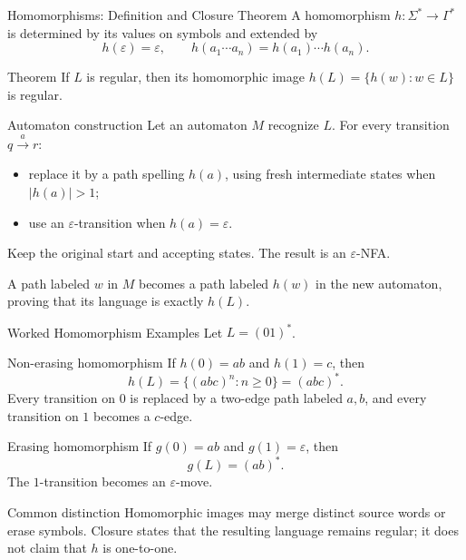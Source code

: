 \documentclass[10pt]{beamer}
\begin{document}
\begin{frame}{Homomorphisms: Definition and Closure Theorem}
  \small
  A homomorphism $h:\Sigma^*\to\Gamma^*$ is determined by its values on
  symbols and extended by
  \[
    h(\varepsilon)=\varepsilon,
    \qquad
    h(a_1\cdots a_n)=h(a_1)\cdots h(a_n).
  \]
  \begin{block}{Theorem}
    If $L$ is regular, then its homomorphic image
    $h(L)=\{h(w):w\in L\}$ is regular.
  \end{block}
  \begin{block}{Automaton construction}
    Let an automaton $M$ recognize $L$. For every transition
    $q\xrightarrow{a}r$:
    \begin{itemize}
      \item replace it by a path spelling $h(a)$, using fresh intermediate
        states when $|h(a)|>1$;
      \item use an $\varepsilon$-transition when $h(a)=\varepsilon$.
    \end{itemize}
    Keep the original start and accepting states. The result is an
    $\varepsilon$-NFA.
  \end{block}
  A path labeled $w$ in $M$ becomes a path labeled $h(w)$ in the new
  automaton, proving that its language is exactly $h(L)$.
\end{frame}

\begin{frame}{Worked Homomorphism Examples}
  \footnotesize
  Let $L=(01)^*$.
  \begin{exampleblock}{Non-erasing homomorphism}
    If $h(0)=ab$ and $h(1)=c$, then
    \[
      h(L)=\{(abc)^n:n\ge0\}=(abc)^*.
    \]
    Every transition on $0$ is replaced by a two-edge path labeled $a,b$,
    and every transition on $1$ becomes a $c$-edge.
  \end{exampleblock}
  \begin{exampleblock}{Erasing homomorphism}
    If $g(0)=ab$ and $g(1)=\varepsilon$, then
    \[
      g(L)=(ab)^*.
    \]
    The $1$-transition becomes an $\varepsilon$-move.
  \end{exampleblock}
  \begin{alertblock}{Common distinction}
    Homomorphic images may merge distinct source words or erase symbols.
    Closure states that the resulting language remains regular; it does not
    claim that $h$ is one-to-one.
  \end{alertblock}
\end{frame}
\end{document}
